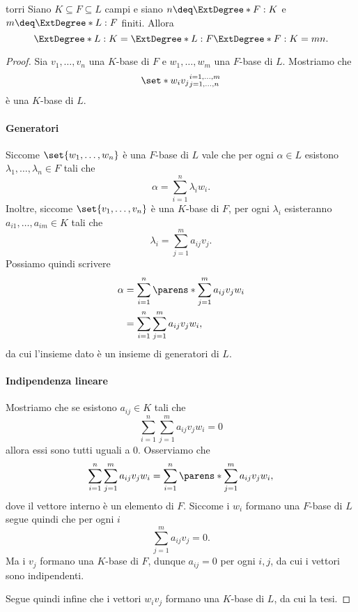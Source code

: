 \begin{theorem}
    {torri}
    Siano $K \subseteq F \subseteq L$ campi e siano $n \deq \ExtDegree*{F : K}$ e $m \deq \ExtDegree*{L : F}$ finiti. Allora \[
        \ExtDegree*{L : K} = \ExtDegree*{L : F}\ExtDegree*{F : K} = mn.    
    \] 
\end{theorem}
\begin{proof}
    Sia $v_1, \dots, v_n$ una $K$-base di $F$ e $w_1, \dots, w_m$ una $F$-base di $L$. Mostriamo che \[
        \set*{w_iv_j}^{i = 1, \dots, m}_{j = 1, \dots, n}  
    \] è una $K$-base di $L$.

    \paragraph*{Generatori}
    Siccome $\set{w_1, \dots, w_n}$ è una $F$-base di $L$ vale che per ogni $\alpha \in L$ esistono $\lambda_1, \dots, \lambda_n \in F$ tali che \[
        \alpha = \sum_{i=1}^n \lambda_iw_i.    
    \] Inoltre, siccome $\set{v_1, \dots, v_n}$ è una $K$-base di $F$, per ogni $\lambda_i$ esisteranno $a_{i1}, \dots, a_{im} \in K$ tali che \[
        \lambda_i = \sum_{j=1}^m a_{ij}v_j.    
    \] Possiamo quindi scrivere \begin{align*}
        \alpha &= \sum_{i=1}^n \parens*{\sum_{j=1}^m a_{ij}v_j} w_i\\
        &= \sum_{i=1}^n \sum_{j=1}^m a_{ij}v_jw_i,
    \end{align*} da cui l'insieme dato è un insieme di generatori di $L$.

    \paragraph*{Indipendenza lineare}
    Mostriamo che se esistono $a_{ij} \in K$ tali che \[
        \sum_{i=1}^n \sum_{j=1}^m a_{ij}v_jw_i = 0
    \] allora essi sono tutti uguali a $0$.
    Osserviamo che \[
        \sum_{i=1}^n \sum_{j=1}^m a_{ij}v_jw_i = \sum_{i=1}^n \parens*{\sum_{j=1}^m a_{ij}v_j} w_i,
    \] dove il vettore interno è un elemento di $F$. Siccome i $w_i$ formano una $F$-base di $L$ segue quindi che per ogni $i$ \[
        \sum_{j=1}^m a_{ij}v_j = 0.
    \] Ma i $v_j$ formano una $K$-base di $F$, dunque $a_{ij} = 0$ per ogni $i, j$, da cui i vettori sono indipendenti.

    Segue quindi infine che i vettori $w_iv_j$ formano una $K$-base di $L$, da cui la tesi.
\end{proof}

